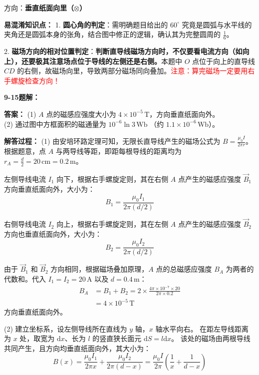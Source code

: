 方向：\textbf{垂直纸面向里（$\otimes$）}

\textbf{易混淆知识点： }
1. \textbf{圆心角的判定}：需明确题目给出的 $60^\circ$ 究竟是圆弧与水平线的夹角还是圆弧本身的张角，结合图中修正的逻辑，确认其为完整圆周的 $\frac{1}{6}$。

2. \textbf{磁场方向的相对位置判定}：\textbf{判断直导线磁场方向时，不仅要看电流方向（如向上），还要极其注意场点位于导线的左侧还是右侧。}本题中 $O$ 点位于向上的直导线 $CD$ 的右侧，故磁场向里，导致两部分磁场同向叠加。\textcolor{red}{注意：算完磁场一定要用右手螺旋检查方向！}

\vspace{1em}

\textbf{9-15题解： }
\setcounter{equation}{0}
\renewcommand{\theHequation}{9-15.\arabic{equation}}

\textbf{答案： }
(1) $A$ 点的磁感应强度大小为 $4 \times 10^{-5}\,\text{T}$，方向垂直纸面向外。\\
(2) 通过图中方框面积的磁通量为 $10^{-6} \ln 3\,\text{Wb}$ （约 $1.1 \times 10^{-6}\,\text{Wb}$）。

\textbf{解答过程： }
(1) 由安培环路定理可知，无限长直导线产生的磁场公式为 $B = \frac{\mu_0 I}{2\pi r}$。
根据题意，点 $A$ 与两导线等距，即距每根导线的距离均为 $r_A = \frac{d}{2} = 20\,\text{cm} = 0.2\,\text{m}$。

左侧导线电流 $I_1$ 向下，根据右手螺旋定则，其在右侧 $A$ 点产生的磁感应强度 $\vec{B}_1$ 方向垂直纸面向外，大小为：
\begin{equation}\label{eq:9-15-1}
	B_1 = \frac{\mu_0 I_1}{2\pi (d/2)}
\end{equation}

右侧导线电流 $I_2$ 向上，根据右手螺旋定则，其在左侧 $A$ 点产生的磁感应强度 $\vec{B}_2$ 方向也垂直纸面向外，大小为：
\begin{equation}\label{eq:9-15-2}
	B_2 = \frac{\mu_0 I_2}{2\pi (d/2)}
\end{equation}

由于 $\vec{B}_1$ 和 $\vec{B}_2$ 方向相同，根据磁场叠加原理，$A$ 点的总磁感应强度 $B_A$ 为两者的代数和。代入 $I_1 = I_2 = 20\,\text{A}$ 以及 $d = 0.4\,\text{m}$：
\begin{align*}
	B_A &= B_1 + B_2 = 2 \times \frac{4\pi \times 10^{-7} \times 20}{2\pi \times 0.2} \\
	&= 4 \times 10^{-5}\,\text{T}
\end{align*}
方向垂直纸面向外。

(2) 建立坐标系，设左侧导线所在直线为 $y$ 轴，$x$ 轴水平向右。
在距左导线距离为 $x$ 处，取宽为 $\mathrm{d}x$、长为 $l$ 的竖直狭长面元 $\mathrm{d}S = l \mathrm{d}x$。
该处的磁场由两根导线共同产生，且方向均垂直纸面向外，其大小为：
\begin{equation}\label{eq:9-15-3}
	B(x) = \frac{\mu_0 I_1}{2\pi x} + \frac{\mu_0 I_2}{2\pi (d-x)} = \frac{\mu_0 I}{2\pi} \left( \frac{1}{x} + \frac{1}{d-x} \right)
\end{equation}

